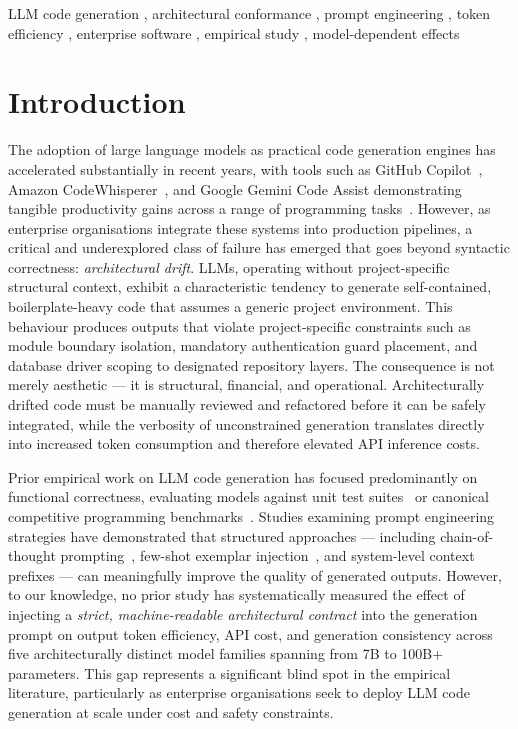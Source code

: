 \documentclass[review,12pt,3p]{elsarticle}
\begin{document}
\begin{frontmatter}
\begin{keyword}
LLM code generation \sep
architectural conformance \sep
prompt engineering \sep
token efficiency \sep
enterprise software \sep
empirical study \sep
model-dependent effects
\end{keyword}

\end{frontmatter}

\linenumbers

\section{Introduction}
\label{sec:intro}

The adoption of large language models as practical code generation engines has accelerated
substantially in recent years, with tools such as GitHub Copilot~\citep{Copilot2022},
Amazon CodeWhisperer~\citep{CodeWhisperer2023}, and Google Gemini Code Assist demonstrating
tangible productivity gains across a range of programming tasks~\citep{Ziegler2022Productivity}.
However, as enterprise organisations integrate these systems into production pipelines, a
critical and underexplored class of failure has emerged that goes beyond syntactic
correctness: \emph{architectural drift}. LLMs, operating without project-specific
structural context, exhibit a characteristic tendency to generate self-contained,
boilerplate-heavy code that assumes a generic project environment. This behaviour produces
outputs that violate project-specific constraints such as module boundary isolation,
mandatory authentication guard placement, and database driver scoping to designated
repository layers. The consequence is not merely aesthetic --- it is structural, financial,
and operational. Architecturally drifted code must be manually reviewed and refactored
before it can be safely integrated, while the verbosity of unconstrained generation
translates directly into increased token consumption and therefore elevated API inference
costs.

Prior empirical work on LLM code generation has focused predominantly on functional
correctness, evaluating models against unit test suites~\citep{Chen2021HumanEval,
Austin2021MBPP} or canonical competitive programming
benchmarks~\citep{Li2022AlphaCode}. Studies examining prompt engineering strategies have
demonstrated that structured approaches --- including chain-of-thought
prompting~\citep{Wei2022ChainOfThought}, few-shot exemplar injection~\citep{Brown2020GPT3},
and system-level context prefixes --- can meaningfully improve the quality of generated
outputs. However, to our knowledge, no prior study has systematically measured the effect
of injecting a \emph{strict, machine-readable architectural contract} into the generation
prompt on output token efficiency, API cost, and generation consistency across five architecturally
distinct model families spanning from 7B to 100B+ parameters. This gap represents a significant
blind spot in the empirical literature, particularly as enterprise organisations seek to deploy
LLM code generation at scale under cost and safety constraints.
\end{document}
